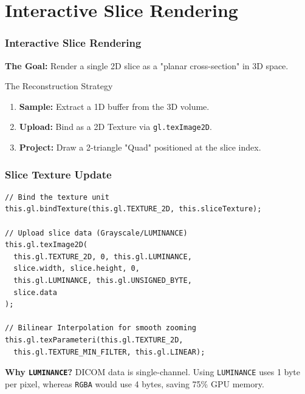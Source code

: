 \section{Interactive Slice Rendering}

\begin{frame}[allowframebreaks]
\frametitle{Interactive Slice Rendering}
\textbf{The Goal:} Render a single 2D slice as a "planar cross-section" in 3D space.

\begin{center}
\end{center}

\begin{block}{The Reconstruction Strategy}
  \begin{enumerate}
    \item \textbf{Sample:} Extract a 1D buffer from the 3D volume.
    \item \textbf{Upload:} Bind as a 2D Texture via \texttt{gl.texImage2D}.
    \item \textbf{Project:} Draw a 2-triangle "Quad" positioned at the slice index.
  \end{enumerate}
\end{block}
\end{frame}

\begin{frame}[fragile]
\frametitle{Slice Texture Update}
\begin{lstlisting}
// Bind the texture unit
this.gl.bindTexture(this.gl.TEXTURE_2D, this.sliceTexture);

// Upload slice data (Grayscale/LUMINANCE)
this.gl.texImage2D(
  this.gl.TEXTURE_2D, 0, this.gl.LUMINANCE,
  slice.width, slice.height, 0,
  this.gl.LUMINANCE, this.gl.UNSIGNED_BYTE,
  slice.data
);

// Bilinear Interpolation for smooth zooming
this.gl.texParameteri(this.gl.TEXTURE_2D, 
  this.gl.TEXTURE_MIN_FILTER, this.gl.LINEAR);
\end{lstlisting}

\small \textbf{Why \texttt{LUMINANCE}?} DICOM data is single-channel. Using \texttt{LUMINANCE} uses 1 byte per pixel, whereas \texttt{RGBA} would use 4 bytes, saving 75\% GPU memory.
\end{frame}

